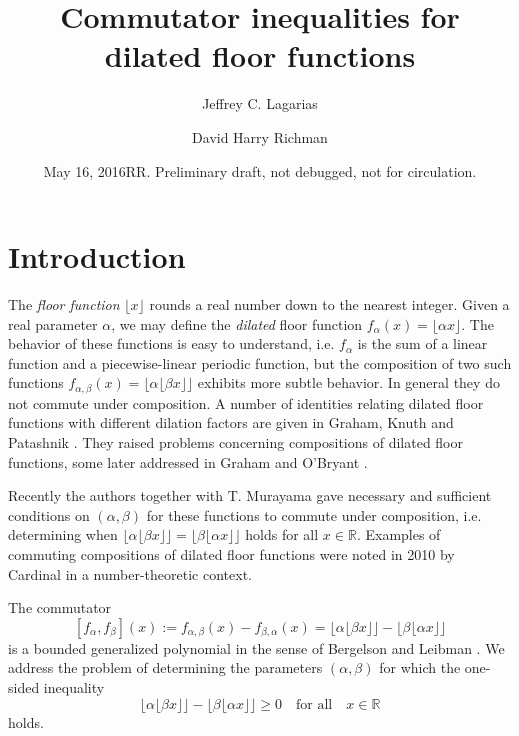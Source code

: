 \documentclass[12pt,letterpaper, reqno]{amsart}
\title{ Commutator inequalities for dilated floor functions}
\author{Jeffrey C. Lagarias}
\author{David Harry Richman}
\date{May 16, 2016RR. Preliminary draft, not debugged, not for circulation.}
\theoremstyle{definition}
\theoremstyle{remark}
\newcommand{\RR}{\ensuremath{\mathbb{R}}}
\newcommand{\floor}[1]{\lfloor{#1}\rfloor}
\begin{document}
\maketitle




%
%
\section{Introduction}
The {\em floor function}  
$\lfloor x \rfloor$
rounds a real number down to the nearest integer. 
Given a real parameter $\alpha$, we may define the {\em dilated} floor function $f_\alpha(x)= \floor{\alpha x}$.
The behavior of these functions is easy to understand, 
i.e. $f_\alpha$ is the sum of a linear function and a piecewise-linear periodic function, but the composition of two such functions 
$ f_{\alpha,\beta}(x) = \floor{\alpha \floor{\beta x}}$
exhibits more subtle behavior. In general they do not commute under composition.
A number of identities relating dilated floor functions with different dilation factors are given in 
Graham, Knuth and Patashnik \cite[Chap. 3]{GKP94}.
They raised problems  \cite[Research problem 50, p.101]{GKP94}
concerning compositions of dilated floor functions, some later addressed in  Graham and O'Bryant \cite{Go10}. 

Recently the  authors together with T. Murayama \cite{LMR16}  
gave necessary and sufficient conditions on $(\alpha, \beta)$ 
for these functions to commute 
under composition, i.e. determining when
 $\floor{\alpha \floor{\beta x}} =  \floor{\beta \floor{\alpha  x}}$ 
 holds for all $x \in \RR.$  Examples of commuting compositions of dilated floor functions
 were noted  in 2010 by  Cardinal \cite[Lemma 6]{Car10} in  a number-theoretic context.

The commutator 
$$
 [ f_{\alpha}, f_{\beta}](x) := f_{\alpha, \beta} (x) - f_{\beta, \alpha}(x)= \floor{\alpha \floor{\beta x}} -  \floor{\beta \floor{\alpha  x}}
$$ 
is a bounded generalized polynomial in
the sense of Bergelson and Leibman \cite{BerL07}. 
We address the problem of determining the parameters $(\alpha, \beta)$ for which  the one-sided inequality \begin{equation}\label{ineq}
\floor{\alpha \floor{\beta x}} -  \floor{\beta \floor{\alpha  x}} \ge 0 \quad \text{for all} \quad  x \in \RR
\end{equation}
holds.
\end{document}
